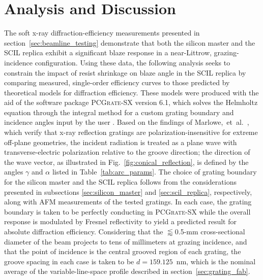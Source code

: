 \documentclass{osa-article}
\begin{document}
\section{Analysis and Discussion}\label{sec:discussion}
The soft x-ray diffraction-efficiency measurements presented in section~\ref{sec:beamline_testing} demonstrate that both the silicon master and the SCIL replica exhibit a significant blaze response in a near-Littrow, grazing-incidence configuration. 
Using these data, the following analysis seeks to constrain the impact of resist shrinkage on blaze angle in the SCIL replica by comparing measured, single-order efficiency curves to those predicted by theoretical models for diffraction efficiency. 
These models were produced with the aid of the software package \textsc{PCGrate-SX} version 6.1, which solves the Helmholtz equation through the integral method for a custom grating boundary and incidence angles input by the user \cite{pcgrate,Goray10}. 
Based on the findings of Marlowe,~et~al.~\cite{Marlowe16}, which verify that x-ray reflection gratings are polarization-insensitive for extreme off-plane geometries, the incident radiation is treated as a plane wave with transverse-electric polarization relative to the groove direction; the direction of the wave vector, as illustrated in Fig.~\ref{fig:conical_reflection}, is defined by the angles $\gamma$ and $\alpha$ listed in Table~\ref{tab:arc_params}. 
The choice of grating boundary for the silicon master and the SCIL replica follows from the considerations presented in subsections \ref{sec:silicon_master} and \ref{sec:scil_replica}, respectively, along with AFM measurements of the tested gratings. 
In each case, the grating boundary is taken to be perfectly conducting in \textsc{PCGrate-SX} while the overall response is modulated by Fresnel reflectivity to yield a predicted result for absolute diffraction efficiency. 
Considering that the $\lessapprox$0.5-mm cross-sectional diameter of the beam projects to tens of millimeters at grazing incidence, and that the point of incidence is the central grooved region of each grating, the groove spacing in each case is taken to be $d=159.125$~nm, which is the nominal average of the variable-line-space profile described in section~\ref{sec:grating_fab}. 
\end{document}
